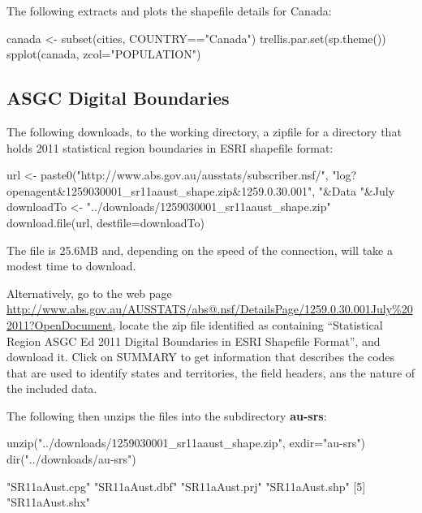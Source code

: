 {The following extracts and plots the shapefile details for Canada:
\begin{Schunk}
\begin{Sinput}
canada <- subset(cities, COUNTRY=="Canada")
trellis.par.set(sp.theme())
spplot(canada, zcol="POPULATION")
\end{Sinput}
\end{Schunk}

\subsection*{ASGC Digital Boundaries}

The following downloads, to the working directory, a zipfile for
a directory that holds 2011 statistical region boundaries in ESRI
shapefile format:
\begin{Schunk}
\begin{Sinput}
url <- paste0("http://www.abs.gov.au/ausstats/subscriber.nsf/",
  "log?openagent&1259030001_sr11aaust_shape.zip&1259.0.30.001",
  "&Data%
  "&July%
downloadTo <- "../downloads/1259030001_sr11aaust_shape.zip"
download.file(url, destfile=downloadTo)
\end{Sinput}
\end{Schunk}
\noindent
The file is 25.6MB and, depending on the speed of the connection,
will take a modest time to download.

Alternatively, go to the web page
  \url{http://www.abs.gov.au/AUSSTATS/abs@.nsf/DetailsPage/1259.0.30.001July%202011?OpenDocument},
    locate the zip file identified as containing ``Statistical
    Region ASGC Ed 2011 Digital Boundaries in ESRI Shapefile Format'',
    and download it.  Click on SUMMARY to get information that
    describes the codes that are used to identify states and
    territories, the field headers, ans the nature of the included
    data.

The following then unzips the files into the
subdirectory {\bf au-srs}:
\begin{Schunk}
\begin{Sinput}
unzip("../downloads/1259030001_sr11aaust_shape.zip", exdir="au-srs")
dir("../downloads/au-srs")
\end{Sinput}
\begin{Soutput}
[1] "SR11aAust.cpg" "SR11aAust.dbf" "SR11aAust.prj" "SR11aAust.shp"
[5] "SR11aAust.shx"
\end{Soutput}
\end{Schunk}

}
